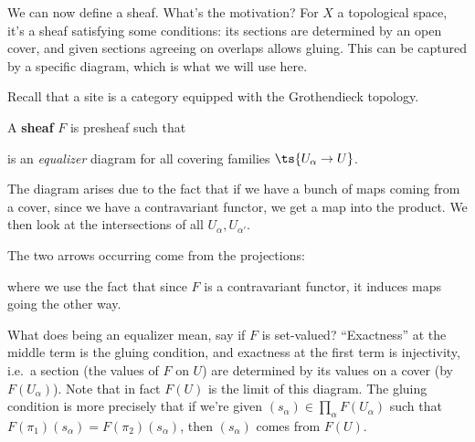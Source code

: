 We can now define a sheaf. What's the motivation? For \(X\) a
topological space, it's a sheaf satisfying some conditions: its sections
are determined by an open cover, and given sections agreeing on overlaps
allows gluing. This can be captured by a specific diagram, which is what
we will use here.

Recall that a site is a category equipped with the Grothendieck
topology.

\begin{definition}[Sheaf]

A \textbf{sheaf} \(F\) is presheaf such that

\begin{center}
\end{center}

is an \emph{equalizer} diagram for all covering families
\(\ts{U_\alpha \to U}\).

\end{definition}

\begin{remark}

The diagram arises due to the fact that if we have a bunch of maps
coming from a cover, since we have a contravariant functor, we get a map
into the product. We then look at the intersections of all
\(U_{\alpha}, U_{\alpha'}\).

The two arrows occurring come from the projections:

\begin{center}
\end{center}

where we use the fact that since \(F\) is a contravariant functor, it
induces maps going the other way.

What does being an equalizer mean, say if \(F\) is set-valued?
``Exactness'' at the middle term is the gluing condition, and exactness
at the first term is injectivity, i.e.~a section (the values of \(F\) on
\(U\)) are determined by its values on a cover (by \(F(U_\alpha)\)).
Note that in fact \(F(U)\) is the limit of this diagram. The gluing
condition is more precisely that if we're given
\((s_\alpha) \in \prod_\alpha F(U_\alpha)\) such that
\(F(\pi_1)(s_\alpha) = F(\pi_2)(s_\alpha)\), then \((s_\alpha)\) comes
from \(F(U)\).

\end{remark}

